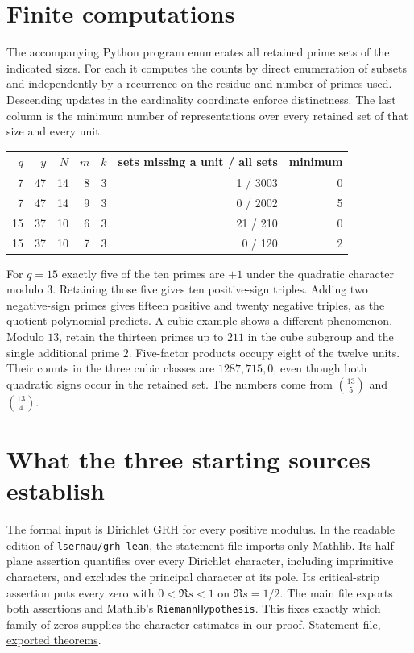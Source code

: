 \documentclass[11pt]{article}
\begin{document}
\section{Finite computations}
The accompanying Python program enumerates all retained prime sets of the
indicated sizes. For each it computes the counts by direct enumeration of
subsets and independently by a recurrence on the residue and number of primes
used. Descending updates in the cardinality coordinate enforce distinctness.
The last column is the minimum number of representations over every retained
set of that size and every unit.
\begin{center}
\begin{tabular}{rrrrrrr}
\toprule
$q$&$y$&$N$&$m$&$k$&sets missing a unit / all sets&minimum\\
\midrule
7&47&14&8&3&1 / 3003&0\\
7&47&14&9&3&0 / 2002&5\\
15&37&10&6&3&21 / 210&0\\
15&37&10&7&3&0 / 120&2\\
\bottomrule
\end{tabular}
\end{center}
For $q=15$ exactly five of the ten primes are $+1$ under the quadratic
character modulo $3$. Retaining those five gives ten positive-sign triples.
Adding two negative-sign primes gives fifteen positive and twenty negative
triples, as the quotient polynomial predicts. A cubic example shows a different phenomenon. Modulo $13$, retain the
thirteen primes up to $211$ in the cube subgroup and the single additional
prime $2$. Five-factor products occupy eight of the twelve units. Their
counts in the three cubic classes are $1287,715,0$, even though both
quadratic signs occur in the retained set. The numbers come from
$\binom{13}{5}$ and $\binom{13}{4}$.

\section{What the three starting sources establish}

The formal input is Dirichlet GRH for every positive modulus.  In the
readable edition of \texttt{lsernau/grh-lean}, the statement file imports
only Mathlib.  Its half-plane assertion quantifies over every Dirichlet
character, including imprimitive characters, and excludes the principal
character at its pole.  Its critical-strip assertion puts every zero with
$0<\Re s<1$ on $\Re s=1/2$.  The main file exports both assertions and
Mathlib's \texttt{RiemannHypothesis}.  This fixes exactly which family of
zeros supplies the character estimates in our proof.
\href{https://github.com/lsernau/grh-lean/blob/72fead102f663d5c7a407964a13dc0cf9d977207/grh/src/Statements.lean}{Statement file},
\href{https://github.com/lsernau/grh-lean/blob/72fead102f663d5c7a407964a13dc0cf9d977207/grh/src/Main.lean}{exported theorems}.
\end{document}
